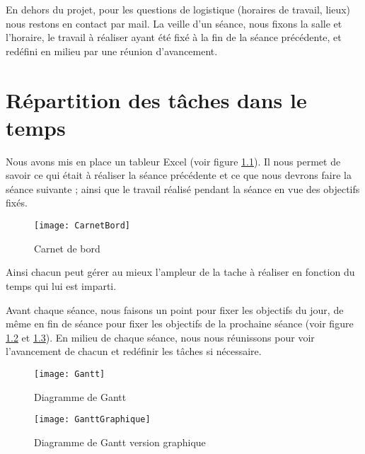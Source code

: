 En dehors du projet, pour les questions de logistique (horaires de travail, lieux) nous restons en contact par mail. La veille d'un séance, nous fixons la salle et l'horaire, le travail à réaliser ayant été fixé à la fin de la séance précédente, et redéfini en milieu par une réunion d'avancement.  

\chapter{Répartition des tâches dans le temps}

Nous avons mis en place un tableur Excel (voir figure \ref{fig:CarnetBord}). Il nous permet de savoir ce qui était à réaliser la séance précédente et ce que nous devrons faire la séance suivante ; ainsi que le travail réalisé pendant la séance en vue des objectifs fixés. 

\begin{figure}[h]
  \centering
  \texttt{[image: CarnetBord]}
  \caption{Carnet de bord}
  \label{fig:CarnetBord}
\end{figure}

Ainsi chacun peut gérer au mieux l'ampleur de la tache à réaliser en fonction du temps qui lui est imparti.
 
Avant chaque séance, nous faisons un point pour fixer les objectifs du jour, de même en fin de séance pour fixer les objectifs de la prochaine séance (voir figure \ref{fig:Gantt} et \ref{fig:GanttGraphique}). 
En milieu de chaque séance, nous nous réunissons pour voir l'avancement de chacun et redéfinir les tâches si nécessaire. 

\begin{figure}[h]
  \centering
  \texttt{[image: Gantt]}
  \caption{Diagramme de Gantt}
  \label{fig:Gantt}
\end{figure}

\begin{figure}[h]
  \centering
  \texttt{[image: GanttGraphique]}
  \caption{Diagramme de Gantt version graphique}
  \label{fig:GanttGraphique}
\end{figure}
